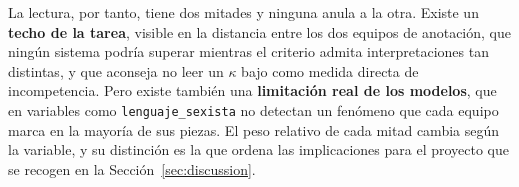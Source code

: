 La lectura, por tanto, tiene dos mitades y ninguna anula a la otra. Existe un
\textbf{techo de la tarea}, visible en la distancia entre los dos equipos de
anotación, que ningún sistema podría superar mientras el criterio admita
interpretaciones tan distintas, y que aconseja no leer un $\kappa$ bajo como medida
directa de incompetencia. Pero existe también una \textbf{limitación real de los
modelos}, que en variables como \texttt{lenguaje\_sexista} no detectan un fenómeno
que cada equipo marca en la mayoría de sus piezas. El peso relativo
de cada mitad cambia según la variable, y su distinción es la que ordena las
implicaciones para el proyecto que se recogen en la
Sección~\ref{sec:discussion}.
